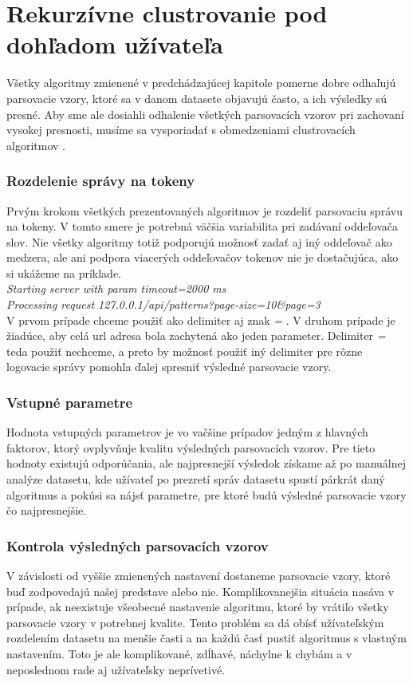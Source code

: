 \chapter{Rekurzívne clustrovanie pod dohľadom užívateľa}

Všetky algoritmy zmienené v predchádzajúcej kapitole pomerne dobre odhaľujú parsovacie vzory, ktoré sa v danom datasete objavujú často, a ich výsledky sú presné. Aby sme ale dosiahli odhalenie všetkých parsovacích vzorov pri zachovaní vysokej presnosti, musíme sa vysporiadať s obmedzeniami clustrovacích algoritmov \parencite{Tovarnak2017}.

\subsection*{Rozdelenie správy na tokeny}
Prvým krokom všetkých prezentovaných algoritmov je rozdeliť parsovaciu správu na tokeny. V tomto smere je potrebná väčšia variabilita pri zadávaní oddeľovača slov. Nie všetky algoritmy totiž podporujú možnosť zadať aj iný oddeľovač ako medzera, ale ani podpora viacerých oddeľovačov tokenov nie je dostačujúca, ako si ukážeme na príklade. \\

\indent \emph{Starting server with param timeout=2000 ms} \\
\indent \emph{Processing request 127.0.0.1/api/patterns?page-size=10\&page=3} \\

V prvom prípade chceme použiť ako delimiter aj znak \emph{=} . V druhom prípade je žiadúce, aby celá url adresa bola zachytená ako jeden parameter. Delimiter \emph{=} teda použiť nechceme, a preto by možnosť použiť iný delimiter pre rôzne logovacie správy pomohla ďalej spresniť výsledné parsovacie vzory.

\subsection*{Vstupné parametre}
Hodnota vstupných parametrov je vo vačšine prípadov jedným z hlavných faktorov, ktorý ovplyvňuje kvalitu výsledných parsovacích vzorov.
Pre tieto hodnoty existujú odporúčania, ale najpresnejší výsledok získame až po manuálnej analýze datasetu, kde užívateľ po prezretí správ datasetu spustí párkrát daný algoritmus a pokúsi sa nájsť parametre, pre ktoré budú výsledné parsovacie vzory čo najpresnejšie.

\subsection*{Kontrola výsledných parsovacích vzorov}
V závislosti od vyššie zmienených nastavení dostaneme parsovacie vzory, ktoré buď zodpovedajú našej predstave alebo nie. Komplikovanejšia situácia nasáva v prípade, ak neexistuje všeobecné nastavenie algoritmu, ktoré by vrátilo všetky parsovacie vzory v potrebnej kvalite. Tento problém sa dá obísť užívateľským rozdelením datasetu na menšie časti a na každú časť pustiť algoritmus s vlastným nastavením. Toto je ale komplikované, zdĺhavé, náchylne k chybám a v neposlednom rade aj užívateľsky neprívetivé.

